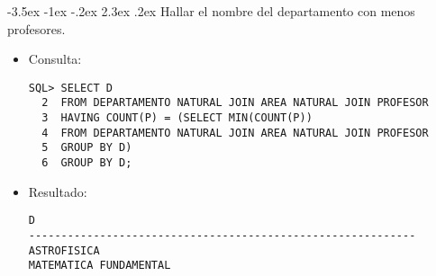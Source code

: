 \documentclass[11pt]{report}
\makeatletter
\renewcommand\chapter{\@startsection{chapter}{0}{\z@}%
    {-3.5ex \@plus -1ex \@minus -.2ex}%
    {2.3ex \@plus.2ex}%
    {\normalfont\Large\bfseries}}
\makeatother
\begin{document}
\chapter{Hallar el nombre del departamento con menos profesores.}
\begin{itemize}
  \item Consulta:
  \begin{verbatim}
SQL> SELECT D
  2  FROM DEPARTAMENTO NATURAL JOIN AREA NATURAL JOIN PROFESOR
  3  HAVING COUNT(P) = (SELECT MIN(COUNT(P))
  4  FROM DEPARTAMENTO NATURAL JOIN AREA NATURAL JOIN PROFESOR
  5  GROUP BY D)
  6  GROUP BY D;
  \end{verbatim}
  \item{Resultado:}
  \begin{verbatim}
D                                                                               
------------------------------------------------------------                    
ASTROFISICA                                                                     
MATEMATICA FUNDAMENTAL                                                                         
  \end{verbatim}
\end{itemize}
\end{document}
